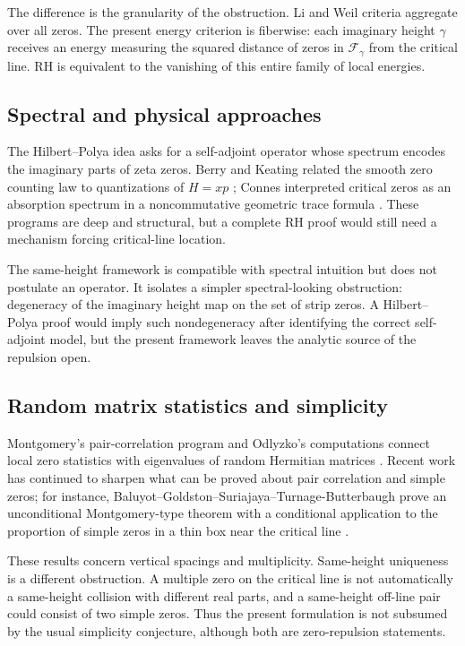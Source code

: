 \documentclass[11pt]{amsart}
\newcommand{\fiber}{\mathcal{F}}
\begin{document}
The difference is the granularity of the obstruction.  Li and Weil criteria
aggregate over all zeros.  The present energy criterion is fiberwise: each
imaginary height \(\gamma\) receives an energy measuring the squared distance of
zeros in \(\fiber_\gamma\) from the critical line.  RH is equivalent to the
vanishing of this entire family of local energies.

\subsection{Spectral and physical approaches}

The Hilbert--Polya idea asks for a self-adjoint operator whose spectrum encodes
the imaginary parts of zeta zeros.  Berry and Keating related the smooth zero
counting law to quantizations of \(H=xp\) \cite{BerryKeating1999}; Connes
interpreted critical zeros as an absorption spectrum in a noncommutative
geometric trace formula \cite{Connes1999}.  These programs are deep and
structural, but a complete RH proof would still need a mechanism forcing
critical-line location.

The same-height framework is compatible with spectral intuition but does not
postulate an operator.  It isolates a simpler spectral-looking obstruction:
degeneracy of the imaginary height map on the set of strip zeros.  A
Hilbert--Polya proof would imply such nondegeneracy after identifying the
correct self-adjoint model, but the present framework leaves the analytic
source of the repulsion open.

\subsection{Random matrix statistics and simplicity}

Montgomery's pair-correlation program and Odlyzko's computations connect local
zero statistics with eigenvalues of random Hermitian matrices
\cite{Montgomery1973,Odlyzko1987}.  Recent work has continued to sharpen what
can be proved about pair correlation and simple zeros; for instance,
Baluyot--Goldston--Suriajaya--Turnage-Butterbaugh prove an unconditional
Montgomery-type theorem with a conditional application to the proportion of
simple zeros in a thin box near the critical line \cite{BaluyotEtAl2024}.

These results concern vertical spacings and multiplicity.  Same-height
uniqueness is a different obstruction.  A multiple zero on the critical line is
not automatically a same-height collision with different real parts, and a
same-height off-line pair could consist of two simple zeros.  Thus the present
formulation is not subsumed by the usual simplicity conjecture, although both
are zero-repulsion statements.
\end{document}
